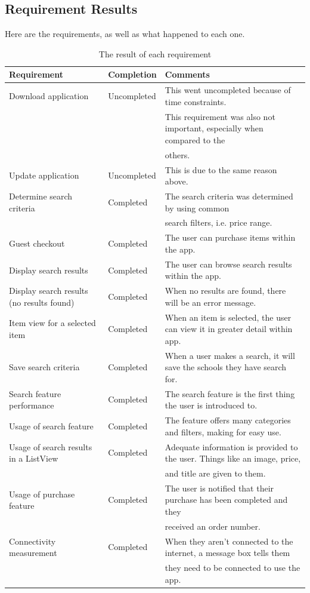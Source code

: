 \documentclass[journal,compsoc, 10pt, draftclsnofoot, onecolumn]{IEEEtran}
\begin{document}
\subsection{Requirement Results}
Here are the requirements, as well as what happened to each one.
\begin{table}[!h]
\centering
\caption{The result of each requirement}
\label{Final requirements}
\begin{tabular}{l|l|l}
\hline
\textbf{Requirement} & \textbf{Completion} & \textbf{Comments} \\ \hline
Download application & Uncompleted & This went uncompleted because of time constraints.
\\ & & This requirement was also not important, especially when compared to the 
\\ & & others. \\ \hline
Update application & Uncompleted & This is due to the same reason above. \\ \hline
Determine search criteria & Completed & The search criteria was determined by  using common
\\ & & search filters, i.e. price range. \\ \hline
Guest checkout & Completed & The user can purchase items within the app. \\ \hline
Display search results & Completed & The user can browse search results within the app.
 \\ \hline
Display search results (no results found) & Completed & When no results are found, there will 
be an error message. \\ \hline
Item view for a selected item & Completed & When an item is selected, the user can view it 
in greater detail within app. \\ \hline
Save search criteria & Completed & When a user makes a search, it will save the schools they 
have search for. \\ \hline
Search feature performance & Completed & The search feature is the first thing the user 
is introduced to. \\ \hline
Usage of search feature & Completed & The feature offers many categories and filters, 
making for easy use. \\ \hline
Usage of search results in a ListView & Completed & Adequate information is provided to 
the user. Things like an image, price, 
\\ & & and title are given to them. \\ \hline
Usage of purchase feature & Completed & The user is notified that their purchase has 
been completed and they \\ & & received an order number. \\ \hline
Connectivity measurement & Completed & When they aren't connected to the internet, 
a message box tells them \\ & &  they need to be connected to use the app. \\ \hline
\end{tabular}
\end{table}
\end{document}
